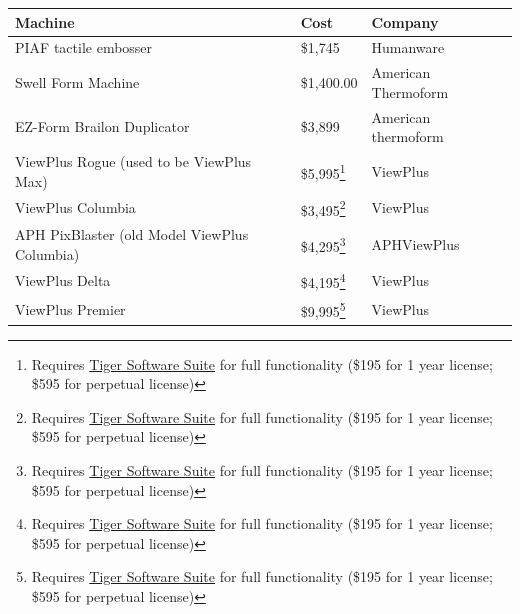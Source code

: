 \documentclass[14pt, letterpaper,twoside]{extreport}
\begin{document}
\begin{longtable}[]{@{}
	>{\raggedright\arraybackslash}p{}
	>{\raggedright\arraybackslash}p{}
	>{\raggedright\arraybackslash}p{}@{}
	}
	\textbf{Machine}                                    & \textbf{Cost}                                                                                                                                                                               & \textbf{Company}    \\
	\midrule\noalign{}
	\endhead
	\bottomrule\noalign{}
	\endlastfoot
	PIAF tactile embosser                               & \$1,745                                                                                                                                                                                     & Humanware           \\[1.5em]
	Swell Form Machine                                  & \$1,400.00                                                                                                                                                                                  & American Thermoform \\[1.5em]
	EZ-Form Brailon Duplicator                          & \$3,899                                                                                                                                                                                     & American thermoform \\[1.5em]
	ViewPlus Rogue \break (used to be ViewPlus Max)     & \$5,995\footnote{Requires \href{https://viewplus.com/product/tiger-software-suite8/}{Tiger Software Suite} for full functionality (\$195 for 1 year license; \$595 for perpetual license)}  & ViewPlus            \\[1.5em]
	ViewPlus Columbia                                   & \$3,495\footnote{Requires \href{https://viewplus.com/product/tiger-software-suite8/}{Tiger Software Suite} for full functionality (\$195 for 1 year license; \$595 for perpetual license)}  & ViewPlus            \\[1.5em]
	APH PixBlaster \break (old Model ViewPlus Columbia) & \$4,295\footnote{Requires \href{https://viewplus.com/product/tiger-software-suite8/}{Tiger Software Suite} for full functionality (\$195 for 1 year license; \$595 for perpetual license)}  & APH\break ViewPlus  \\[1.5em]
	ViewPlus Delta                                      & \$4,195\footnote{Requires \href{https://viewplus.com/product/tiger-software-suite8/}{Tiger Software Suite} for full functionality (\$195 for 1 year license; \$595 for perpetual license)}  & ViewPlus            \\[1.5em]
	ViewPlus Premier                                    & \$9,995\footnote{Requires \href{https://viewplus.com/product/tiger-software-suite8/}{Tiger Software Suite} for full functionality (\$195 for 1 year license; \$595 for perpetual license)}  & ViewPlus            \\[1.5em]

\end{longtable}
\end{document}
